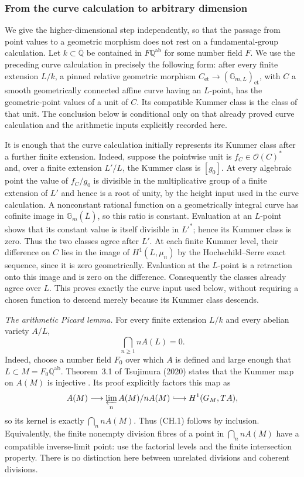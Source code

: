\subsubsection*{From the curve calculation to arbitrary dimension}

We give the higher-dimensional step independently, so that the passage
from point values to a geometric morphism does not rest on a
fundamental-group calculation. Let $k\subset\overline{\mathbb Q}$ be
contained in $F\mathbb Q^{\mathrm{ab}}$ for some number field $F$.
We use the preceding curve calculation in precisely the following
form: after every finite extension $L/k$, a pinned relative geometric
morphism $C_{\mathrm{et}}\to(\mathbb G_{m,L})_{\mathrm{et}}$, with
$C$ a smooth geometrically connected affine curve having an $L$-point,
has the geometric-point values of a unit of $C$. Its compatible Kummer
class is the class of that unit. The conclusion below is conditional
only on that already proved curve calculation and the arithmetic
inputs explicitly recorded here.

It is enough that the curve calculation initially represents its
Kummer class after a further finite extension. Indeed, suppose the
pointwise unit is $f_C\in\mathcal O(C)^*$ and, over a finite
extension $L'/L$, the Kummer class is $[g_0]$. At every algebraic
point the value of $f_C/g_0$ is divisible in the multiplicative group
of a finite extension of $L'$ and hence is a root of unity, by the
height input used in the curve calculation. A nonconstant rational
function on a geometrically integral curve has cofinite image in
$\mathbb G_m(\overline L)$, so this ratio is constant. Evaluation at
an $L$-point shows that its constant value is itself divisible in
$L'^*$; hence its Kummer class is zero. Thus the two classes agree
after $L'$. At each finite Kummer level, their difference on $C$
lies in the image of $H^1(L,\mu_n)$ by the Hochschild--Serre exact
sequence, since it is zero geometrically. Evaluation at the $L$-point
is a retraction onto this image and is zero on the difference.
Consequently the classes already agree over $L$. This proves exactly
the curve input used below, without requiring a chosen function to
descend merely because its Kummer class descends.

\emph{The arithmetic Picard lemma.}
For every finite extension $L/k$ and every abelian variety $A/L$,
\[
                 \bigcap_{n\geq1}nA(L)=0.                 \tag{CH.1}
\]
Indeed, choose a number field $F_0$ over which $A$ is defined and large
enough that $L\subset M=F_0\mathbb Q^{\mathrm{ab}}$. Theorem~3.1 of
Tsujimura (2020) states that the Kummer map on $A(M)$ is injective
\cite{Tsujimura2020}. Its proof explicitly factors this map as
\[
 A(M)\longrightarrow\varprojlim_n A(M)/nA(M)
       \lhook\joinrel\longrightarrow H^1(G_M,T A),
\]
so its kernel is exactly $\bigcap_n nA(M)$. Thus (CH.1) follows by
inclusion. Equivalently, the finite nonempty division fibres of a point
in $\bigcap_n nA(M)$ have a compatible inverse-limit point: use the
factorial levels and the finite intersection property. There is no
distinction here between unrelated divisions and coherent divisions.

